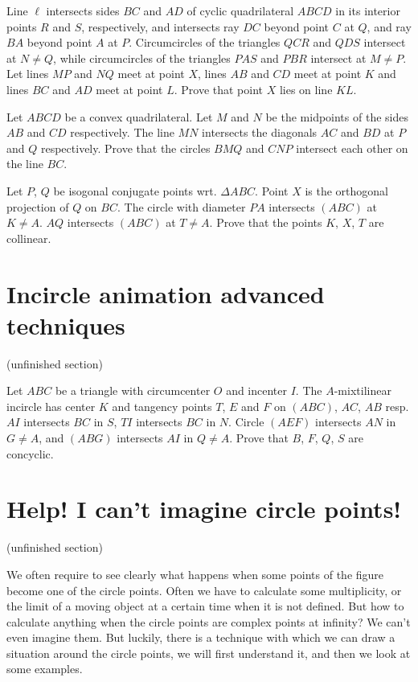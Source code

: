 \documentclass[a4paper]{article}
\begin{document}
\begin{exercise}[APMO 2024 5]
    Line $\ell$ intersects sides $BC$ and $AD$ of cyclic quadrilateral $ABCD$ in its interior points $R$ and $S$, respectively, and intersects ray $DC$ beyond point $C$ at $Q$, and ray $BA$ beyond point $A$ at $P$. Circumcircles of the triangles $QCR$ and $QDS$ intersect at $N \neq Q$, while circumcircles of the triangles $PAS$ and $PBR$ intersect at $M\neq P$. Let lines $MP$ and $NQ$ meet at point $X$, lines $AB$ and $CD$ meet at point $K$ and lines $BC$ and $AD$ meet at point $L$. Prove that point $X$ lies on line $KL$.
\end{exercise}

\begin{exercise}
    Let $ABCD$ be a convex quadrilateral. Let $M$ and $N$ be the midpoints of the sides $AB$ and $CD$ respectively. The line $MN$ intersects the diagonals $AC$ and $BD$ at $P$ and $Q$ respectively. Prove that the circles $BMQ$ and $CNP$ intersect each other on the line $BC$.
\end{exercise}

\begin{exercise}
    Let $P$, $Q$ be isogonal conjugate points wrt. $\Delta ABC$. Point $X$ is the orthogonal projection of $Q$ on $BC$. The circle with diameter $PA$ intersects $(ABC)$ at $K\ne A$. $AQ$ intersects $(ABC)$ at $T\ne A$. Prove that the points $K$, $X$, $T$ are collinear.
\end{exercise}

\section{Incircle animation advanced techniques}
(unfinished section)
\begin{exercise}
    Let $ABC$ be a triangle with circumcenter $O$ and incenter $I$. The $A$-mixtilinear incircle has center $K$ and tangency points $T$, $E$ and $F$ on $(ABC)$, $AC$, $AB$ resp. $AI$ intersects $BC$ in $S$, $TI$ intersects $BC$ in $N$. Circle $(AEF)$ intersects $AN$ in $G\ne A$, and $(ABG)$ intersects $AI$ in $Q\ne A$. Prove that $B$, $F$, $Q$, $S$ are concyclic.
\end{exercise}

\section{Help! I can't imagine circle points!}
(unfinished section)

We often require to see clearly what happens when some points of the figure become one of the circle points. Often we have to calculate some multiplicity, or the limit of a moving object at a certain time when it is not defined. But how to calculate anything when the circle points are complex points at infinity? We can't even imagine them. But luckily, there is a technique with which we can draw a situation around the circle points, we will first understand it, and then we look at some examples.
\end{document}
